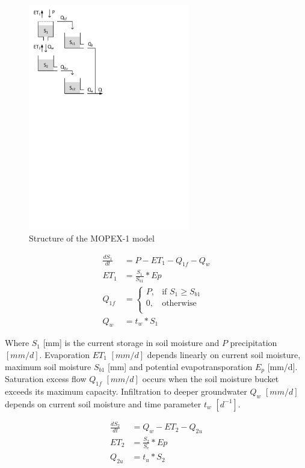 { 																	%
\begin{figure}
\includegraphics[trim=1cm 18cm 7cm 1cm,width=7cm,keepaspectratio]{./files/24_schematic.pdf}
\caption{Structure of the MOPEX-1 model} \label{fig:24_schematic}
\end{figure}

\begin{align}
	\frac{dS_1}{dt} &= P-ET_1-Q_{1f}-Q_w \\
	ET_1 &= \frac{S_1}{S_{b1}}*Ep\\
	Q_{1f} &= \begin{cases}
		P, &\text{if } S_1 \geq S_{b1} \\
		0, & \text{otherwise} \\
	\end{cases} \\
	Q_w &= t_w*S_1
\end{align}

Where $S_1$ [mm] is the current storage in soil moisture and $P$ precipitation $[mm/d]$. Evaporation $ET_1$ $[mm/d]$ depends linearly on current soil moisture, maximum soil moisture $S_{b1}$ [mm] and potential evapotransporation $E_p$ [mm/d]. Saturation excess flow $Q_{1f}$  $[mm/d]$ occurs when the soil moisture bucket exceeds its maximum capacity. Infiltration to deeper groundwater $Q_w$  $[mm/d]$ depends on current soil moisture and time parameter $t_w$  $[d^{-1}]$.

} %

\begin{align}
	\frac{dS_2}{dt} &= Q_w-ET_2-Q_{2u}\\
	ET_2 &= \frac{S_2}{S_{e}}*Ep\\
	Q_{2u} &= t_u*S_2
\end{align}

